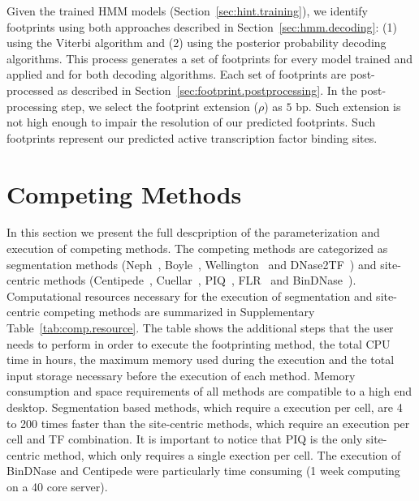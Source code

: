 Given the trained HMM models (Section~\ref{sec:hint.training}), we identify footprints using both approaches described in Section~\ref{sec:hmm.decoding}: (1) using the Viterbi algorithm and (2) using the posterior probability decoding algorithms. This process generates a set of footprints for every model trained and applied and for both decoding algorithms. Each set of footprints are post-processed as described in Section~\ref{sec:footprint.postprocessing}. In the post-processing step, we select the footprint extension ($\rho$) as $5$ bp. Such extension is not high enough to impair the resolution of our predicted footprints. Such footprints represent our predicted active transcription factor binding sites.














\section{Competing Methods}
\label{sec:competing.methods}

In this section we present the full descpription of the parameterization and execution of competing methods. The competing methods are categorized as segmentation methods (Neph~\cite{neph2012a}, Boyle~\cite{boyle2011}, Wellington~\cite{piper2013} and DNase2TF~\cite{sung2014}) and site-centric methods (Centipede~\cite{pique2011}, Cuellar~\cite{cuellar2012}, PIQ~\cite{sherwood2014}, FLR~\cite{yardimci2014} and BinDNase~\cite{kahara2015}). Computational resources necessary for the execution of segmentation and site-centric competing methods are summarized in Supplementary Table~\ref{tab:comp.resource}. The table shows the additional steps that the user needs to perform in order to execute the footprinting method, the total CPU time in hours, the maximum memory used during the execution and the total input storage necessary before the execution of each method. Memory consumption and space requirements of all methods are compatible to a high end desktop. Segmentation based methods, which require a execution per cell, are 4 to 200 times faster than the site-centric methods, which require an execution per cell and TF combination. It is important to notice that PIQ is the only site-centric method, which only requires a single exection per cell. The execution of BinDNase and Centipede were particularly time consuming (1 week computing on a 40 core server).

